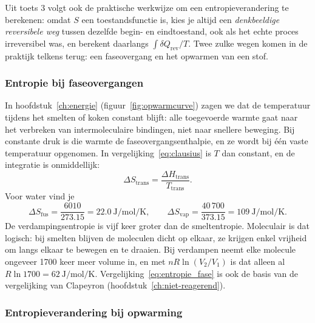 Uit toets 3 volgt ook de praktische werkwijze om een entropieverandering te berekenen: omdat $S$ een toestandsfunctie is, kies je altijd een \emph{denkbeeldige reversibele weg} tussen dezelfde begin- en eindtoestand, ook als het echte proces irreversibel was, en berekent daarlangs $\int\delta Q_\text{rev}/T$. Twee zulke wegen komen in de praktijk telkens terug: een faseovergang en het opwarmen van een stof.

\subsubsection{Entropie bij faseovergangen}
\label{sec:entropie-faseovergangen}

In hoofdstuk~\ref{ch:energie} (figuur~\ref{fig:opwarmcurve}) zagen we dat de temperatuur tijdens het smelten of koken constant blijft: alle toegevoerde warmte gaat naar het verbreken van intermoleculaire bindingen, niet naar snellere beweging. Bij constante druk is die warmte de faseovergangsenthalpie, en ze wordt bij \'e\'en vaste temperatuur opgenomen. In vergelijking~\eqref{eq:clausius} is $T$ dan constant, en de integratie is onmiddellijk:
\begin{equation}
\Delta S_{\text{trans}} = \frac{\Delta H_{\text{trans}}}{T_{\text{trans}}} .
\label{eq:entropie_fase}
\end{equation}
Voor water vind je
\[
\Delta S_\text{fus} = \frac{6010}{273.15} = \SI{22.0}{\joule\per\mole\per\kelvin},
\qquad
\Delta S_\text{vap} = \frac{40\,700}{373.15} = \SI{109}{\joule\per\mole\per\kelvin}.
\]
De verdampingsentropie is vijf keer groter dan de smeltentropie. Moleculair is dat logisch: bij smelten blijven de moleculen dicht op elkaar, ze krijgen enkel vrijheid om langs elkaar te bewegen en te draaien. Bij verdampen neemt elke molecule ongeveer 1700 keer meer volume in, en met $nR\ln(V_2/V_1)$ is dat alleen al $R\ln 1700 = \SI{62}{\joule\per\mole\per\kelvin}$. Vergelijking~\eqref{eq:entropie_fase} is ook de basis van de vergelijking van Clapeyron (hoofdstuk~\ref{ch:niet-reagerend}).

\subsubsection{Entropieverandering bij opwarming}
\label{sec:entropie-opwarming}

